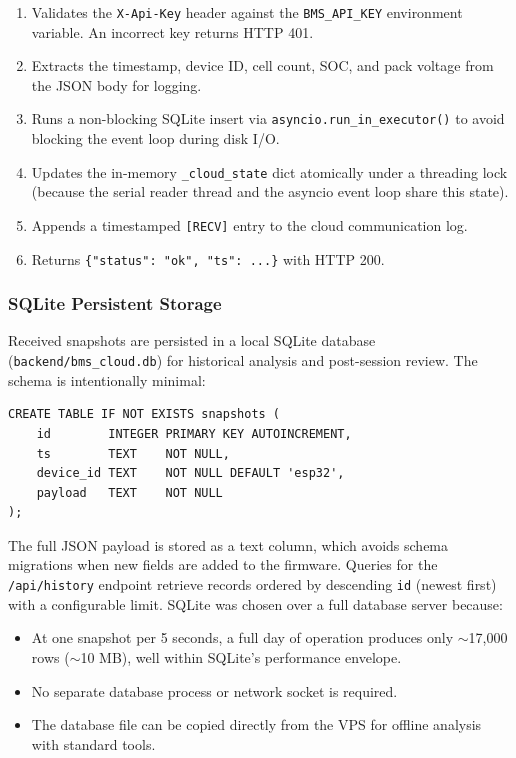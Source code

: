\begin{enumerate}
    \item Validates the \texttt{X-Api-Key} header against the \texttt{BMS\_API\_KEY} environment variable. An incorrect key returns HTTP 401.
    \item Extracts the timestamp, device ID, cell count, SOC, and pack voltage from the JSON body for logging.
    \item Runs a non-blocking SQLite insert via \texttt{asyncio.run\_in\_executor()} to avoid blocking the event loop during disk I/O.
    \item Updates the in-memory \texttt{\_cloud\_state} dict atomically under a threading lock (because the serial reader thread and the asyncio event loop share this state).
    \item Appends a timestamped \texttt{[RECV]} entry to the cloud communication log.
    \item Returns \texttt{\{"status": "ok", "ts": ...\}} with HTTP 200.
\end{enumerate}

\subsubsection{SQLite Persistent Storage}

Received snapshots are persisted in a local SQLite database (\texttt{backend/bms\_cloud.db}) for historical analysis and post-session review. The schema is intentionally minimal:

\begin{verbatim}
CREATE TABLE IF NOT EXISTS snapshots (
    id        INTEGER PRIMARY KEY AUTOINCREMENT,
    ts        TEXT    NOT NULL,
    device_id TEXT    NOT NULL DEFAULT 'esp32',
    payload   TEXT    NOT NULL
);
\end{verbatim}

The full JSON payload is stored as a text column, which avoids schema migrations when new fields are added to the firmware. Queries for the \texttt{/api/history} endpoint retrieve records ordered by descending \texttt{id} (newest first) with a configurable limit. SQLite was chosen over a full database server because:

\begin{itemize}
    \item At one snapshot per 5 seconds, a full day of operation produces only $\sim$17,000 rows ($\sim$10 MB), well within SQLite's performance envelope.
    \item No separate database process or network socket is required.
    \item The database file can be copied directly from the VPS for offline analysis with standard tools.
\end{itemize}

